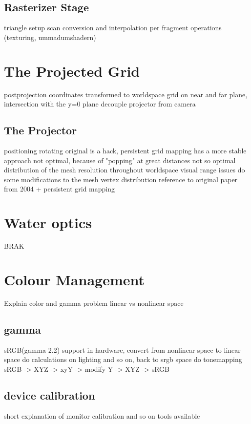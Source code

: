 \subsection{Rasterizer Stage}

triangle setup
scan conversion and interpolation
per fragment operations (texturing, ummadumshadern)

\section{The Projected Grid}

postprojection coordinates transformed to worldspace
grid on near and far plane, intersection with the y=0 plane
decouple projector from camera

\subsection{The Projector}
positioning
rotating
original is a hack, persistent grid mapping has a more stable approach
not optimal, because of "popping" at great distances
not so optimal distribution of the mesh resolution throughout worldspace
visual range issues
do some modifications to the mesh vertex distribution
reference to original paper from 2004 + persistent grid mapping

\section{Water optics}
BRAK

\section{Colour Management}

Explain color and gamma problem
linear vs nonlinear space

\subsection{gamma}
sRGB(gamma 2.2) support in hardware, convert from nonlinear space to linear
space do calculations on lighting and so on, back to srgb space
do tonemapping sRGB -> XYZ -> xyY -> modify Y -> XYZ -> sRGB

\subsection{device calibration}
short explanation of monitor calibration and so on
tools available


